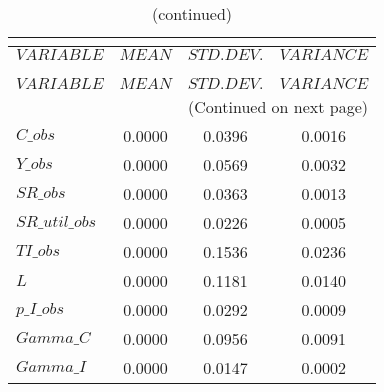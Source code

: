  
\begin{center}
\begin{longtable}{lccc} 
\caption{THEORETICAL MOMENTS}\\
 \label{Table:th_moments}\\
\toprule 
$VARIABLE       $	 & 	 $         MEAN$	 & 	 $    STD. DEV.$	 & 	 $     VARIANCE$\\
\midrule \endfirsthead 
\caption{(continued)}\\
 \toprule \\ 
$VARIABLE       $	 & 	 $         MEAN$	 & 	 $    STD. DEV.$	 & 	 $     VARIANCE$\\
\midrule \endhead 
\midrule \multicolumn{4}{r}{(Continued on next page)} \\ \bottomrule \endfoot 
\bottomrule \endlastfoot 
$C\_obs         $	 & 	       0.0000	 & 	       0.0396	 & 	       0.0016 \\ 
$Y\_obs         $	 & 	       0.0000	 & 	       0.0569	 & 	       0.0032 \\ 
$SR\_obs        $	 & 	       0.0000	 & 	       0.0363	 & 	       0.0013 \\ 
$SR\_util\_obs  $	 & 	       0.0000	 & 	       0.0226	 & 	       0.0005 \\ 
$TI\_obs        $	 & 	       0.0000	 & 	       0.1536	 & 	       0.0236 \\ 
$L              $	 & 	       0.0000	 & 	       0.1181	 & 	       0.0140 \\ 
$p\_I\_obs      $	 & 	       0.0000	 & 	       0.0292	 & 	       0.0009 \\ 
$Gamma\_C       $	 & 	       0.0000	 & 	       0.0956	 & 	       0.0091 \\ 
$Gamma\_I       $	 & 	       0.0000	 & 	       0.0147	 & 	       0.0002 \\ 
\end{longtable}
 \end{center}
